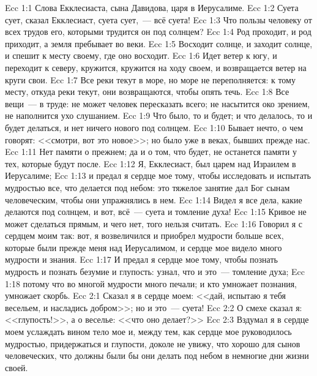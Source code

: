 \vs Ecc 1:1 Слова Екклесиаста, сына Давидова, царя в Иерусалиме.
\rsbpar\vs Ecc 1:2 Суета сует, сказал Екклесиаст, суета сует,~--- всё суета!
\vs Ecc 1:3 Что пользы человеку от всех трудов его, которыми трудится он под солнцем?
\vs Ecc 1:4 Род проходит, и род приходит, а земля пребывает во веки.
\vs Ecc 1:5 Восходит солнце, и заходит солнце, и спешит к месту своему, где оно восходит.
\vs Ecc 1:6 Идет ветер к югу, и переходит к северу, кружится, кружится на ходу своем, и возвращается ветер на круги свои.
\vs Ecc 1:7 Все реки текут в море, но море не переполняется: к тому месту, откуда реки текут, они возвращаются, чтобы опять течь.
\vs Ecc 1:8 Все вещи~--- в труде: не может человек пересказать всего; не насытится око зрением, не наполнится ухо слушанием.
\vs Ecc 1:9 Что было, то и будет; и что делалось, то и будет делаться, и нет ничего нового под солнцем.
\vs Ecc 1:10 Бывает нечто, о чем говорят: <<смотри, вот это новое>>; но  было уже в веках, бывших прежде нас.
\vs Ecc 1:11 Нет памяти о прежнем; да и о том, что будет, не останется памяти у тех, которые будут после.
\rsbpar\vs Ecc 1:12 Я, Екклесиаст, был царем над Израилем в Иерусалиме;
\vs Ecc 1:13 и предал я сердце мое тому, чтобы исследовать и испытать мудростью все, что делается под небом: это тяжелое занятие дал Бог сынам человеческим, чтобы они упражнялись в нем.
\vs Ecc 1:14 Видел я все дела, какие делаются под солнцем, и вот, всё~--- суета и томление духа!
\vs Ecc 1:15 Кривое не может сделаться прямым, и чего нет, того нельзя считать.
\vs Ecc 1:16 Говорил я с сердцем моим так: вот, я возвеличился и приобрел мудрости больше всех, которые были прежде меня над Иерусалимом, и сердце мое видело много мудрости и знания.
\vs Ecc 1:17 И предал я сердце мое тому, чтобы познать мудрость и познать безумие и глупость: узнал, что и это~--- томление духа;
\vs Ecc 1:18 потому что во многой мудрости много печали; и кто умножает познания, умножает скорбь.
\vs Ecc 2:1 Сказал я в сердце моем: <<дай, испытаю я тебя весельем, и насладись добром>>; но и это~--- суета!
\vs Ecc 2:2 О смехе сказал я: <<глупость!>>, а о веселье: <<что оно делает?>>
\vs Ecc 2:3 Вздумал я в сердце моем услаждать вином тело мое и, между тем, как сердце мое руководилось мудростью, придержаться и глупости, доколе не увижу, что хорошо для сынов человеческих, что должны были бы они делать под небом в немногие дни жизни своей.
